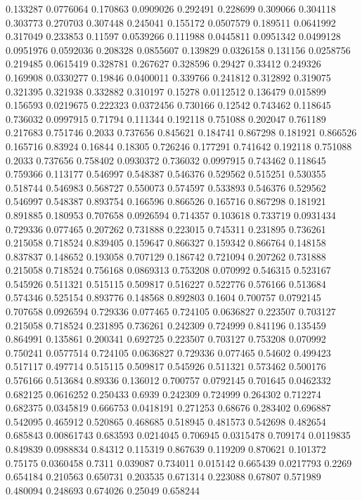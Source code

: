 0.133287 0.0776064
0.170863 0.0909026
0.292491 0.228699
0.309066 0.304118
0.303773 0.270703
0.307448 0.245041
0.155172 0.0507579
0.189511 0.0641992
0.317049 0.233853
0.11597 0.0539266
0.111988 0.0445811
0.0951342 0.0499128
0.0951976 0.0592036
0.208328 0.0855607
0.139829 0.0326158
0.131156 0.0258756
0.219485 0.0615419
0.328781 0.267627
0.328596 0.29427
0.33412 0.249326
0.169908 0.0330277
0.19846 0.0400011
0.339766 0.241812
0.312892 0.319075
0.321395 0.321938
0.332882 0.310197
0.15278 0.0112512
0.136479 0.015899
0.156593 0.0219675
0.222323 0.0372456
0.730166 0.12542
0.743462 0.118645
0.736032 0.0997915
0.71794 0.111344
0.192118 0.751088
0.202047 0.761189
0.217683 0.751746
0.2033 0.737656
0.845621 0.184741
0.867298 0.181921
0.866526 0.165716
0.83924 0.16844
0.18305 0.726246
0.177291 0.741642
0.192118 0.751088
0.2033 0.737656
0.758402 0.0930372
0.736032 0.0997915
0.743462 0.118645
0.759366 0.113177
0.546997 0.548387
0.546376 0.529562
0.515251 0.530355
0.518744 0.546983
0.568727 0.550073
0.574597 0.533893
0.546376 0.529562
0.546997 0.548387
0.893754 0.166596
0.866526 0.165716
0.867298 0.181921
0.891885 0.180953
0.707658 0.0926594
0.714357 0.103618
0.733719 0.0931434
0.729336 0.077465
0.207262 0.731888
0.223015 0.745311
0.231895 0.736261
0.215058 0.718524
0.839405 0.159647
0.866327 0.159342
0.866764 0.148158
0.837837 0.148652
0.193058 0.707129
0.186742 0.721094
0.207262 0.731888
0.215058 0.718524
0.756168 0.0869313
0.753208 0.070992
0.546315 0.523167
0.545926 0.511321
0.515115 0.509817
0.516227 0.522776
0.576166 0.513684
0.574346 0.525154
0.893776 0.148568
0.892803 0.1604
0.700757 0.0792145
0.707658 0.0926594
0.729336 0.077465
0.724105 0.0636827
0.223507 0.703127
0.215058 0.718524
0.231895 0.736261
0.242309 0.724999
0.841196 0.135459
0.864991 0.135861
0.200341 0.692725
0.223507 0.703127
0.753208 0.070992
0.750241 0.0577514
0.724105 0.0636827
0.729336 0.077465
0.54602 0.499423
0.517117 0.497714
0.515115 0.509817
0.545926 0.511321
0.573462 0.500176
0.576166 0.513684
0.89336 0.136012
0.700757 0.0792145
0.701645 0.0462332
0.682125 0.0616252
0.250433 0.6939
0.242309 0.724999
0.264302 0.712274
0.682375 0.0345819
0.666753 0.0418191
0.271253 0.68676
0.283402 0.696887
0.542095 0.465912
0.520865 0.468685
0.518945 0.481573
0.542698 0.482654
0.685843 0.00861743
0.683593 0.0214045
0.706945 0.0315478
0.709174 0.0119835
0.849839 0.0988834
0.84312 0.115319
0.867639 0.119209
0.870621 0.101372
0.75175 0.0360458
0.7311 0.039087
0.734011 0.015142
0.665439 0.0217793
0.2269 0.654184
0.210563 0.650731
0.203535 0.671314
0.223088 0.67807
0.571989 0.480094
0.248693 0.674026
0.25049 0.658244
